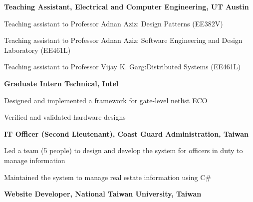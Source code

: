 


\begin{myexp}
    \item \textbf{Teaching Assistant, Electrical and Computer Engineering, UT
        Austin}  
  \begin{mybullet}
  	\item Teaching assistant to Professor Adnan Aziz: Design Patterns
  	    (EE382V)  
  	\item Teaching assistant to Professor Adnan Aziz: Software Engineering
  	    and Design Laboratory (EE461L)  
  	\item Teaching assistant to Professor Vijay K. Garg:Distributed Systems 
  	    (EE461L)  
  \end{mybullet}
    \item \textbf{Graduate Intern Technical, Intel}   
  \begin{mybullet}
  	\item Designed and implemented a framework for gate-level netlist ECO
	\item Verified and validated hardware designs
  \end{mybullet}
   \item \textbf{IT Officer (Second Lieutenant), Coast Guard Administration, Taiwan }   
      \begin{mybullet}
      \item Led a team (5 people) to design and develop the system for officers in duty to manage information
      \item Maintained the system to manage real estate information using C\#
   \end{mybullet}
   \item \textbf{Website Developer, National Taiwan University, Taiwan}  

\end{myexp}
